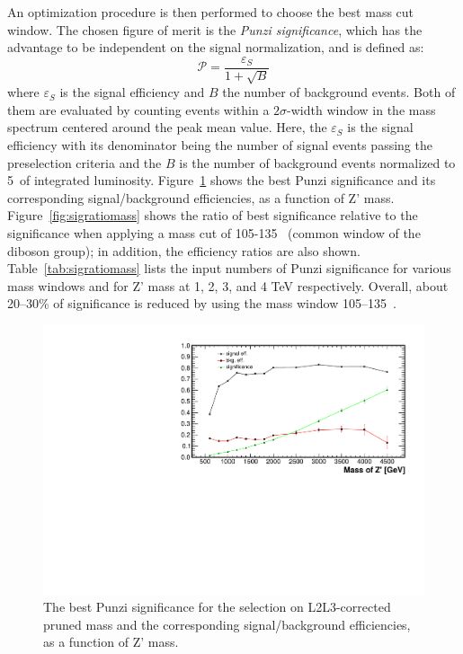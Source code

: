 An optimization procedure is then performed to choose the best mass cut window.
 The chosen figure of merit is the \emph{Punzi significance}, which has the 
advantage to be independent on the signal normalization, and is defined as:
$$\mathcal{P} = \frac{\varepsilon_S}{1+\sqrt{B}}$$
where $\varepsilon_S$ is 
the signal efficiency and $B$ the number of background events. 
Both of them are evaluated  by counting events within a $2\sigma$-width window
in the \mX mass spectrum centered around the peak mean value.
Here, the $\varepsilon_S$ is the signal efficiency with its 
denominator being the number of signal events passing the preselection 
criteria and the $B$ is the number of background events normalized to 
5~\fbinv of integrated luminosity. 
Figure~\ref{fig:sigmass} shows the best Punzi significance and
 its corresponding signal/background efficiencies, as a function of Z' mass. 
Figure~\ref{fig:sigratiomass} shows the ratio of best significance relative 
to the significance when applying a mass cut of 105-135~\GeV 
(common window of the diboson group); in addition, the efficiency ratios are 
also shown. 
Table~\ref{tab:sigratiomass} lists the input numbers of Punzi significance 
for various mass windows and for Z' mass at 1, 2, 3, and 4 TeV respectively.
Overall, about 20--30\% of significance is reduced by using the mass window 
105--135~\GeV. 


\begin{figure}[!htb]
  \begin{center}
    \includegraphics[width=.9\textwidth]{figures/significance.pdf}
  \end{center}
  \caption{The best Punzi significance for the selection on 
L2L3-corrected pruned mass and the corresponding signal/background 
efficiencies, as a function of Z' mass. }  
  \label{fig:sigmass}
\end{figure}


